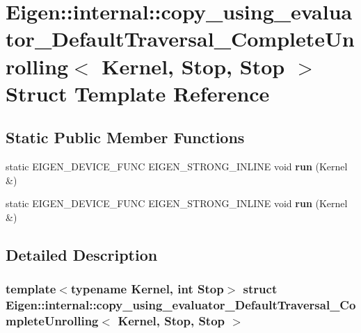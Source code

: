 \hypertarget{struct_eigen_1_1internal_1_1copy__using__evaluator___default_traversal___complete_unrolling_3_01c1b4c78ce0d389049a18ce1f9fdd8138}{}\section{Eigen\+:\+:internal\+:\+:copy\+\_\+using\+\_\+evaluator\+\_\+\+Default\+Traversal\+\_\+\+Complete\+Unrolling$<$ Kernel, Stop, Stop $>$ Struct Template Reference}
\label{struct_eigen_1_1internal_1_1copy__using__evaluator___default_traversal___complete_unrolling_3_01c1b4c78ce0d389049a18ce1f9fdd8138}
\subsection*{Static Public Member Functions}
\begin{DoxyCompactItemize}
\item 
\mbox{\label{struct_eigen_1_1internal_1_1copy__using__evaluator___default_traversal___complete_unrolling_3_01c1b4c78ce0d389049a18ce1f9fdd8138_a4a12c3b2e8f901f1989cffedabdff5bf}} 
static E\+I\+G\+E\+N\+\_\+\+D\+E\+V\+I\+C\+E\+\_\+\+F\+U\+NC E\+I\+G\+E\+N\+\_\+\+S\+T\+R\+O\+N\+G\+\_\+\+I\+N\+L\+I\+NE void {\bfseries run} (Kernel \&)
\item 
\mbox{\label{struct_eigen_1_1internal_1_1copy__using__evaluator___default_traversal___complete_unrolling_3_01c1b4c78ce0d389049a18ce1f9fdd8138_a4a12c3b2e8f901f1989cffedabdff5bf}} 
static E\+I\+G\+E\+N\+\_\+\+D\+E\+V\+I\+C\+E\+\_\+\+F\+U\+NC E\+I\+G\+E\+N\+\_\+\+S\+T\+R\+O\+N\+G\+\_\+\+I\+N\+L\+I\+NE void {\bfseries run} (Kernel \&)
\end{DoxyCompactItemize}


\subsection{Detailed Description}
\subsubsection*{template$<$typename Kernel, int Stop$>$\newline
struct Eigen\+::internal\+::copy\+\_\+using\+\_\+evaluator\+\_\+\+Default\+Traversal\+\_\+\+Complete\+Unrolling$<$ Kernel, Stop, Stop $>$}




